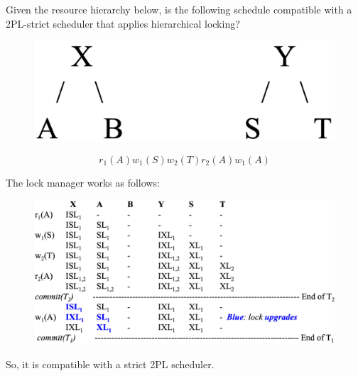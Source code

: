 \documentclass[12pt, a4paper]{report}
\newtheorem[style=M,bodystyle=\normalfont]{theorem}{Theorem}
\newtheorem[style=M,bodystyle=\normalfont]{corollary}{Corollary}
\newtheorem[style=M,bodystyle=\normalfont]{lemma}{Lemma}
\newtheorem[style=M,bodystyle=\normalfont]{definition}{Definition}
\begin{document}
\begin{Exercise}[label=19]
    Given the resource hierarchy below, is the following schedule compatible with a 2PL-strict scheduler that applies hierarchical locking?
    \begin{figure}[H]
        \centering
        \includegraphics[width=1\linewidth]{images/HL1.png}
    \end{figure}
    \[r_1(A) w_1(S) w_2(T) r_2(A) w_1(A)\]
\end{Exercise}
\begin{Answer}[ref=18]
    The lock manager works as follows: 
    \begin{figure}[H]
        \centering
        \includegraphics[width=1\linewidth]{images/HLsol.png}
    \end{figure}
    So, it is compatible with a strict 2PL scheduler. 
\end{Answer}

\newpage
\end{document}
